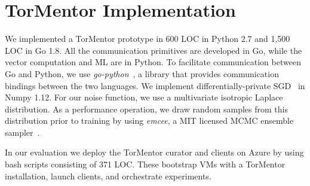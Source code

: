 \chapter{TorMentor Implementation}
\label{sec:impl}

We implemented a TorMentor prototype in 600 \ac{LOC}
in Python 2.7 and 1,500 LOC in Go 1.8. All the communication
primitives are developed in Go, while the vector computation and ML
are in Python. To facilitate communication between Go and Python, we
use \emph{go-python}~\cite{gopython}, a library that provides
communication bindings between the two languages. We implement
differentially-private SGD~\cite{Song:2013} in Numpy 1.12. For our
noise function, we use a multivariate isotropic Laplace distribution.
As a performance operation, we draw random samples from this
distribution prior to training by using \emph{emcee}, a \ac{MIT}
licensed \ac{MCMC} ensemble sampler~\cite{mcmc:2013}.

In our evaluation we deploy the TorMentor curator and clients on
Azure by using bash scripts consisting of 371 LOC. These bootstrap VMs
with a TorMentor installation, launch clients, and orchestrate experiments.


